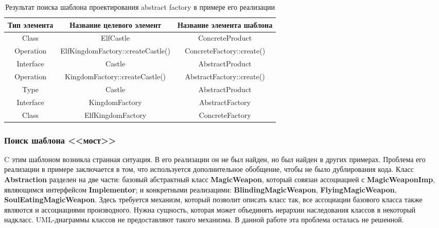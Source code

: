 \begin{table}[ht!]
    \centering
    \begin{tabulary}{\textwidth}{|C|C|C|}
        \hline
        Тип элемента & Название целевого элемент & Название элемента шаблона \\
        \hline
        Class & ElfCastle & ConcreteProduct \\
        \hline
        Operation & ElfKingdomFactory::createCastle() & ConcreteFactory::create() \\
        \hline
        Interface & Castle & AbstractProduct \\
        \hline
        Operation & KingdomFactory::createCastle() & AbstractFactory::create() \\
        \hline
        Type & Castle & AbstractProduct \\
        \hline
        Interface & KingdomFactory & AbstractFactory \\
        \hline
        Class & ElfKingdomFactory & ConcreteFactory \\
        \hline
    \end{tabulary}
    \caption{Результат поиска шаблона проектирования abstract factory в примере его реализации}
    \label{table:java-design-patterns-abstract-factory}
\end{table}

\subsubsection{Поиск шаблона <<мост>>}

C этим шаблоном возникла странная ситуация.
В его реализации он не был найден, но был найден в других примерах.
Проблема его реализации в примере заключается в том,
что используется дополнительное обобщение,
чтобы не было дублирования кода.
Класс \textbf{Abstraction} разделен на две части: базовый абстрактный класс
\textbf{MagicWeapon},
который совязан ассоциацией с \textbf{MagicWeaponImp},
являющимся интерфейсом \textbf{Implementor};
и конкретными реализацими: \textbf{BlindingMagicWeapon},
\textbf{FlyingMagicWeapon}, \textbf{SoulEatingMagicWeapon}.
Здесь требуется механизм, который позволит описать класс так,
все ассоциации базового класса также являются и ассоциациями производного.
Нужна сущность, которая может объединять иерархии наследования классов в
некоторый надкласс.
UML-диаграммы классов не предоставляют такого механизма.
В данной работе эта проблема осталась не решенной.

